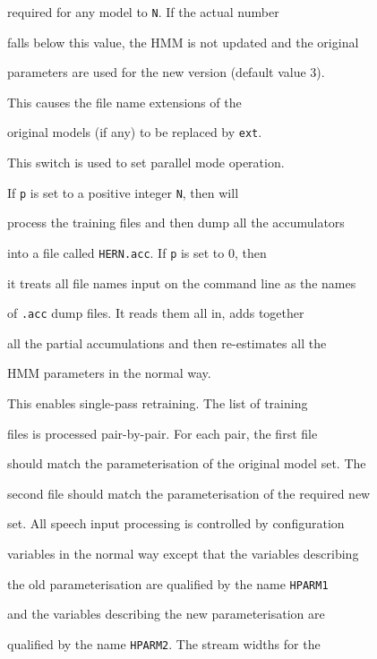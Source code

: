 \begin{optlist}
    required for any model to {\tt N}.  If the actual number


    falls below this value, the HMM is not updated and the original


    parameters are used for the new version (default value 3).





    This causes the file name extensions of the


      original models (if any) to be replaced by {\tt ext}.





    This switch is used to set parallel mode operation.


      If {\tt p} is set to a positive integer {\tt N}, then  will


      process the training files and then dump all the accumulators


      into a file called {\tt HERN.acc}.  If {\tt p} is set to 0, then


      it treats all file names input on the command line as the names


      of {\tt .acc} dump files.  It reads them all in, adds together


      all the partial accumulations and then re-estimates all the


      HMM parameters in the normal way. 





    This enables single-pass retraining.  The list of training


      files is processed pair-by-pair.  For each pair, the first file


      should match the parameterisation of the original model set.  The


      second file should match the parameterisation of the required new


      set.  All speech input processing is controlled by configuration


      variables in the normal way except that the variables describing


      the old parameterisation are qualified by the name \texttt{HPARM1}


      and the variables describing the new parameterisation are


      qualified by the name \texttt{HPARM2}.  The stream widths for the



\end{optlist}

